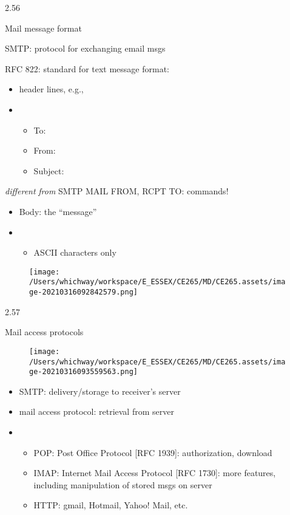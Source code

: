 \documentclass[
]{article}
\begin{document}
2.56

Mail message format

SMTP: protocol for exchanging email msgs

RFC 822: standard for text message format:

\begin{itemize}
\item
  header lines, e.g.,
\item
  \begin{itemize}
  \item
    To:
  \item
    From:
  \item
    Subject:
  \end{itemize}
\end{itemize}

\emph{different} \emph{from} SMTP MAIL FROM, RCPT TO: commands!

\begin{itemize}
\item
  Body: the ``message''
\item
  \begin{itemize}
  \item
    ASCII characters only
  \end{itemize}
\end{itemize}

\begin{figure}
\centering
\texttt{[image: /Users/whichway/workspace/E\_ESSEX/CE265/MD/CE265.assets/image-20210316092842579.png]}
\caption{}
\end{figure}

2.57

Mail access protocols

\begin{figure}
\centering
\texttt{[image: /Users/whichway/workspace/E\_ESSEX/CE265/MD/CE265.assets/image-20210316093559563.png]}
\caption{}
\end{figure}

\begin{itemize}
\item
  SMTP: delivery/storage to receiver's server
\item
  mail access protocol: retrieval from server
\item
  \begin{itemize}
  \item
    POP: Post Office Protocol {[}RFC 1939{]}: authorization, download
  \item
    IMAP: Internet Mail Access Protocol {[}RFC 1730{]}: more features,
    including manipulation of stored msgs on server
  \item
    HTTP: gmail, Hotmail, Yahoo! Mail, etc.
  \end{itemize}
\end{itemize}
\end{document}
